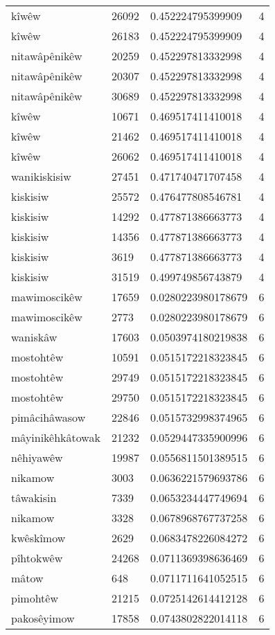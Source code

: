 \begin{longtable}{llll}
kîwêw & 26092 & 0.452224795399909 & 4 \\
kîwêw & 26183 & 0.452224795399909 & 4 \\
nitawâpênikêw & 20259 & 0.452297813332998 & 4 \\
nitawâpênikêw & 20307 & 0.452297813332998 & 4 \\
nitawâpênikêw & 30689 & 0.452297813332998 & 4 \\
kîwêw & 10671 & 0.469517411410018 & 4 \\
kîwêw & 21462 & 0.469517411410018 & 4 \\
kîwêw & 26062 & 0.469517411410018 & 4 \\
wanikiskisiw & 27451 & 0.471740471707458 & 4 \\
kiskisiw & 25572 & 0.476477808546781 & 4 \\
kiskisiw & 14292 & 0.477871386663773 & 4 \\
kiskisiw & 14356 & 0.477871386663773 & 4 \\
kiskisiw & 3619 & 0.477871386663773 & 4 \\
kiskisiw & 31519 & 0.499749856743879 & 4 \\
mawimoscikêw & 17659 & 0.0280223980178679 & 6 \\
mawimoscikêw & 2773 & 0.0280223980178679 & 6 \\
waniskâw & 17603 & 0.0503974180219838 & 6 \\
mostohtêw & 10591 & 0.0515172218323845 & 6 \\
mostohtêw & 29749 & 0.0515172218323845 & 6 \\
mostohtêw & 29750 & 0.0515172218323845 & 6 \\
pimâcihâwasow & 22846 & 0.0515732998374965 & 6 \\
mâyinikêhkâtowak & 21232 & 0.0529447335900996 & 6 \\
nêhiyawêw & 19987 & 0.0556811501389515 & 6 \\
nikamow & 3003 & 0.0636221579693786 & 6 \\
tâwakisin & 7339 & 0.0653234447749694 & 6 \\
nikamow & 3328 & 0.0678968767737258 & 6 \\
kwêskîmow & 2629 & 0.0683478226084272 & 6 \\
pîhtokwêw & 24268 & 0.0711369398636469 & 6 \\
mâtow & 648 & 0.0711711641052515 & 6 \\
pimohtêw & 21215 & 0.0725142614412128 & 6 \\
pakosêyimow & 17858 & 0.0743802822014118 & 6 \\

\end{longtable}
